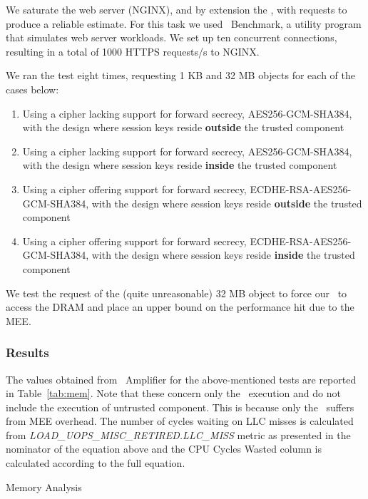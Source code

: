 \documentclass[../../../main.tex]{subfiles}
\begin{document}
We saturate the web server (NGINX), and by extension the \enclavemodel, with
requests to produce a reliable estimate. For this task we used
\Apache~Benchmark, a utility program that simulates web server workloads. We
set up ten concurrent connections, resulting in a total of 1000 HTTPS
requests/s to NGINX.

We ran the test eight times, requesting 1 KB and 32 MB objects for each of the
cases below:
\begin{enumerate}
  \item Using a cipher lacking support for forward secrecy, AES256-GCM-SHA384,
    with the design where session keys reside \textbf{outside} the trusted
    component
  \item Using a cipher lacking support for forward secrecy, AES256-GCM-SHA384,
    with the design where session keys reside \textbf{inside} the trusted
    component
  \item Using a cipher offering support for forward secrecy,
    ECDHE-RSA-AES256-GCM-SHA384, with the design where session keys reside
    \textbf{outside} the trusted component
  \item Using a cipher offering support for forward secrecy,
    ECDHE-RSA-AES256-GCM-SHA384, with the design where session keys reside
    \textbf{inside} the trusted component
\end{enumerate}

We test the request of the (quite unreasonable) 32 MB object to force our
\enclavemodel~to access the DRAM and place an upper bound on the performance
hit due to the MEE.

\subsubsection*{Results}
The values obtained from \VTune~Amplifier for the above-mentioned tests are
reported in Table~\ref{tab:mem}. Note that these concern only the
\enclavemodel~execution and do not include the execution of untrusted
component. This is because only the \enclaveprogram~suffers from MEE overhead.
The number of cycles waiting on LLC misses is calculated from
\textit{LOAD\_UOPS\_MISC\_RETIRED.LLC\_MISS} metric as presented in the
nominator of the equation above and the CPU Cycles Wasted column is calculated
according to the full equation.

\begin{table}[H]
  \caption{Memory Analysis}
  \label{tab:mem}
\end{table}
\end{document}
